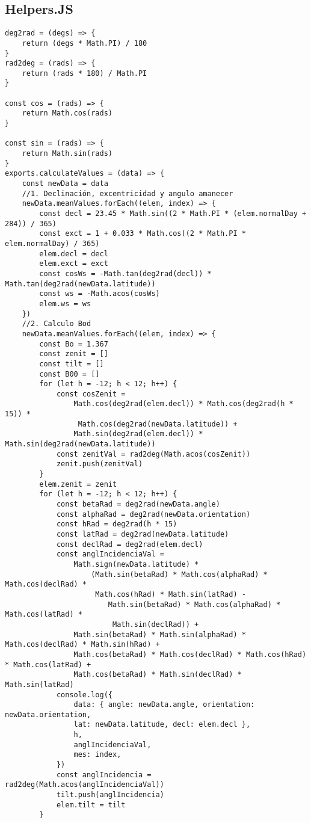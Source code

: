 \subsection{Helpers.JS}

\begin{lstlisting}[style=ES6, caption={Server/helpers/helpers.js}]
deg2rad = (degs) => {
	return (degs * Math.PI) / 180
}
rad2deg = (rads) => {
	return (rads * 180) / Math.PI
}

const cos = (rads) => {
	return Math.cos(rads)
}

const sin = (rads) => {
	return Math.sin(rads)
}
exports.calculateValues = (data) => {
	const newData = data
	//1. Declinación, excentricidad y angulo amanecer
	newData.meanValues.forEach((elem, index) => {
		const decl = 23.45 * Math.sin((2 * Math.PI * (elem.normalDay + 284)) / 365)
		const exct = 1 + 0.033 * Math.cos((2 * Math.PI * elem.normalDay) / 365)
		elem.decl = decl
		elem.exct = exct
		const cosWs = -Math.tan(deg2rad(decl)) * Math.tan(deg2rad(newData.latitude))
		const ws = -Math.acos(cosWs)
		elem.ws = ws
	})
	//2. Calculo Bod
	newData.meanValues.forEach((elem, index) => {
		const Bo = 1.367
		const zenit = []
		const tilt = []
		const B00 = []
		for (let h = -12; h < 12; h++) {
			const cosZenit =
				Math.cos(deg2rad(elem.decl)) * Math.cos(deg2rad(h * 15)) *
				 Math.cos(deg2rad(newData.latitude)) +
				Math.sin(deg2rad(elem.decl)) * Math.sin(deg2rad(newData.latitude))
			const zenitVal = rad2deg(Math.acos(cosZenit))
			zenit.push(zenitVal)
		}
		elem.zenit = zenit
		for (let h = -12; h < 12; h++) {
			const betaRad = deg2rad(newData.angle)
			const alphaRad = deg2rad(newData.orientation)
			const hRad = deg2rad(h * 15)
			const latRad = deg2rad(newData.latitude)
			const declRad = deg2rad(elem.decl)
			const anglIncidenciaVal =
				Math.sign(newData.latitude) *
					(Math.sin(betaRad) * Math.cos(alphaRad) * Math.cos(declRad) *
					 Math.cos(hRad) * Math.sin(latRad) -
						Math.sin(betaRad) * Math.cos(alphaRad) * Math.cos(latRad) *
						 Math.sin(declRad)) +
				Math.sin(betaRad) * Math.sin(alphaRad) * Math.cos(declRad) * Math.sin(hRad) +
				Math.cos(betaRad) * Math.cos(declRad) * Math.cos(hRad) * Math.cos(latRad) +
				Math.cos(betaRad) * Math.sin(declRad) * Math.sin(latRad)
			console.log({
				data: { angle: newData.angle, orientation: newData.orientation, 
				lat: newData.latitude, decl: elem.decl },
				h,
				anglIncidenciaVal,
				mes: index,
			})
			const anglIncidencia = rad2deg(Math.acos(anglIncidenciaVal))
			tilt.push(anglIncidencia)
			elem.tilt = tilt
		}


\end{lstlisting}
